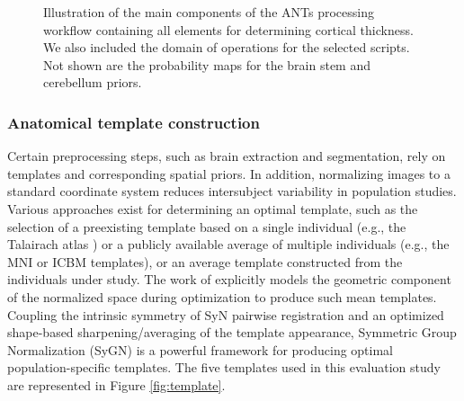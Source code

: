 \begin{figure}
  \centering
  \caption{Illustration of the main components of the ANTs processing 
  workflow containing all elements for determining cortical thickness. 
  We also included the domain of operations for the selected scripts.
  Not shown are the probability maps for the brain stem and cerebellum
  priors. {\color{blue}{All template-based prior probability maps are 
  generated prior to pipeline processing of 
  each individual subject.}}}
  \label{fig:pipeline}
\end{figure}

\subsubsection{Anatomical template construction}

Certain preprocessing steps, such as brain extraction and
segmentation, rely on templates and corresponding spatial priors. 
In addition, normalizing images to a standard coordinate system
reduces intersubject variability in population studies.  Various
approaches exist for determining an optimal template,
such as the selection of a preexisting template based on a single individual
(e.g., the Talairach atlas \citep{Talairach1988}) or a publicly available average of multiple individuals
(e.g., the MNI \citep{Collins1994} or ICBM \citep{Mazziotta1995}
templates), or an average template constructed from the individuals under study.
The work of \cite{avants2010} explicitly models the geometric component of the 
normalized space during optimization to produce such mean templates.  Coupling the intrinsic symmetry of 
SyN pairwise registration \citep{avants2011} and an
optimized shape-based sharpening/averaging of the template appearance, Symmetric Group Normalization (SyGN) is a powerful framework for producing optimal population-specific templates. The five templates used in this evaluation
study are represented in Figure \ref{fig:template}.


